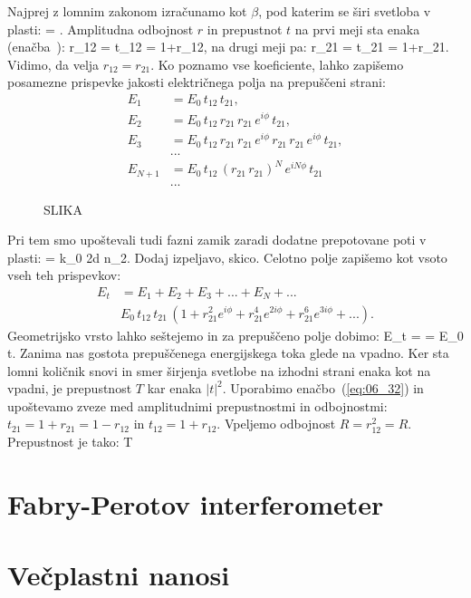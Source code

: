 Najprej z lomnim zakonom izračunamo kot $\beta$, pod katerim se širi svetloba v plasti:
\beq
\sin\beta = \sin\alpha.
\label{eq:06_25}
\eeq
Amplitudna odbojnost $r$ in prepustnot $t$ na prvi meji sta enaka (enačba~):
\beq
r_{12} = \qquad 
{}\qquad t_{12} = 1+r_{12},
\label{eq:06_26}
\eeq
na drugi meji pa:
\beq
r_{21} = \qquad 
{}\qquad t_{21} = 1+r_{21}.
\label{eq:06_27}
\eeq
Vidimo, da velja $r_{12} = r_{21}$. Ko poznamo vse koeficiente, lahko zapišemo
posamezne prispevke jakosti električnega polja na prepuščeni strani:
\begin{align}
E_1 &= E_0\,t_{12}\,t_{21},\\
E_2 &= E_0\,t_{12}\,r_{21}\,r_{21}\,e^{i\phi}\,t_{21},\\
E_3 &= E_0\,t_{12}\,r_{21}\,r_{21}\,e^{i\phi}\,r_{21}\,r_{21}\,e^{i\phi}\,t_{21},\\
&...\\
E_{N+1} &= E_0\,t_{12}\,\left(r_{21}\,r_{21}\right)^N\,e^{iN\phi}\,t_{21}\\
&...
\label{eq:06_29}
\end{align}

\begin{figure}[ht]
\centering
\def\svgwidth{140truemm} 
%
\caption{SLIKA}
\label{fig:06_Nrez}
\end{figure}

Pri tem smo upoštevali tudi fazni zamik zaradi dodatne prepotovane poti v plasti:
\beq
\phi = k_0 2d \cos \beta n_2.
\label{eq:06_31}
\eeq
Dodaj izpeljavo, skico. 
Celotno polje zapišemo kot vsoto vseh teh prispevkov:
\begin{align}
E_t &= E_1+E_2+E_3+... + E_N + ... \\
& E_0\, t_{12}\,t_{21}\,\left(1 + r_{21}^2 e^{i\phi} + r_{21}^4 e^{2i\phi} + r_{21}^6 e^{3i\phi} + ... \right).
\label{eq:06_30}
\end{align}
Geometrijsko vrsto lahko seštejemo in za prepuščeno polje dobimo:
\beq
E_t =  = E_0 t.
\label{eq:06_32}
\eeq
Zanima nas gostota prepuščenega energijskega toka glede na vpadno. Ker sta lomni količnik snovi
in smer širjenja svetlobe na izhodni strani enaka kot na vpadni, je prepustnost $T$ kar enaka $|t|^2$.
Uporabimo enačbo~(\ref{eq:06_32}) in upoštevamo zveze med amplitudnimi prepustnostmi in odbojnostmi:
$t_{21} = 1+r_{21} = 1-r_{12}$ in $t_{12} = 1+r_{12}$. Vpeljemo odbojnost $R = r_{12}^2 = R$.
Prepustnost je tako:
\beq
T
\label{eq:06_33}
\eeq



\section{Fabry-Perotov interferometer}

\section{Večplastni nanosi}

